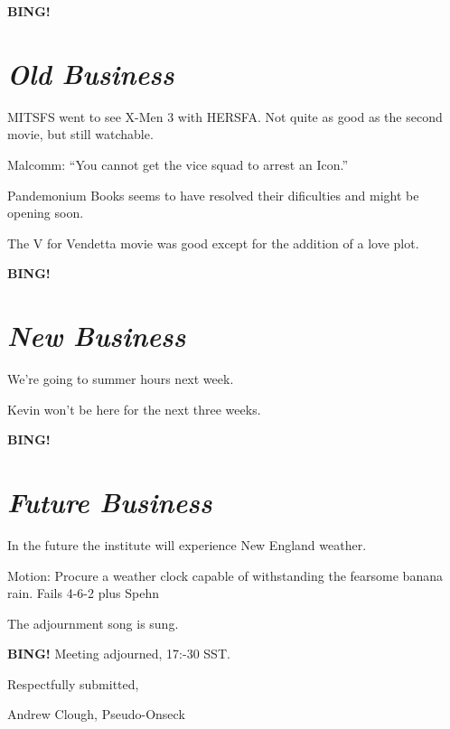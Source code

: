 \documentclass[10pt]{article}
\newcommand{\bing}{{\bf BING!} }
\newcommand{\goto}[1]{\bing \vskip 12pt \section*{{\em{#1}}}}
\newcommand{\ps}{ plus Spehn\xspace}
\begin{document}

\goto{Old Business}

MITSFS went to see X-Men 3 with HERSFA.  Not quite as good as the second movie, but still watchable.

Malcomm:  ``You cannot get the vice squad to arrest an Icon.''

Pandemonium Books seems to have resolved their dificulties and might be opening soon.

The V for Vendetta movie was good except for the addition of a love plot.

\goto{New Business}

We're going to summer hours next week.

Kevin won't be here for the next three weeks.

\goto{Future Business}

In the future the institute will experience New England weather.

Motion:  Procure a weather clock capable of withstanding the fearsome banana rain.  Fails 4-6-2\ps

The adjournment song is sung.


\bing
\noindent
Meeting adjourned, 17:-30 SST.

\vspace{18pt}

\centerline{Respectfully submitted,}
\centerline{Andrew Clough, Pseudo-Onseck}
\end{document}
